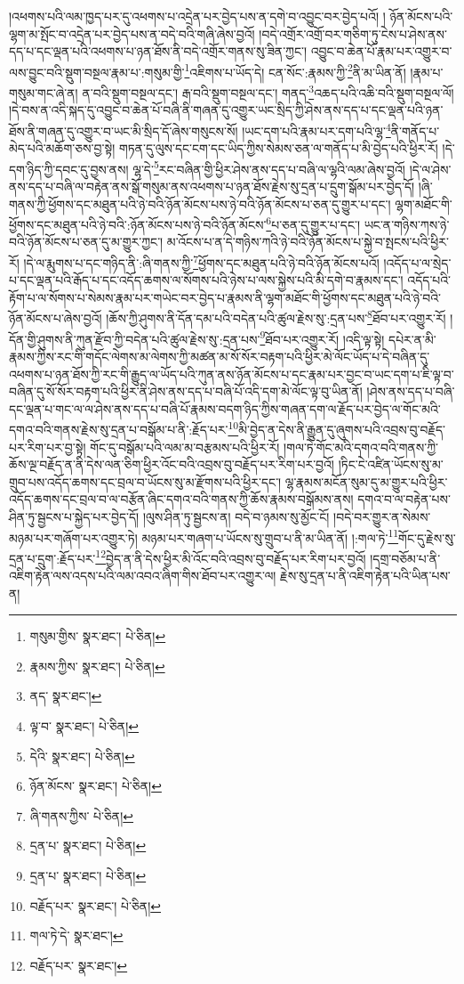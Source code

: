 །འཕགས་པའི་ལམ་ཁྱད་པར་དུ་འཕགས་པ་འདྲེན་པར་བྱེད་པས་ན་དགེ་བ་འབྱུང་བར་བྱེད་པའོ། །
ཉོན་མོངས་པའི་ལྷག་མ་སྤོང་བ་འདྲེན་པར་བྱེད་པས་ན་བདེ་བའི་གཞི་ཞེས་བྱའོ། །བདེ་འགྲོར་འགྲོ་བར་གཅིག་ཏུ་ངེས་པ་ཤེས་ནས་དད་པ་དང་ལྡན་པའི་འཕགས་པ་ཉན་ཐོས་ནི་བདེ་འགྲོར་གནས་སུ་ཟིན་ཀྱང་། འབྱུང་བ་ཆེན་པོ་རྣམ་པར་འགྱུར་བ་ལས་བྱུང་བའི་སྡུག་བསྔལ་རྣམ་པ་:གསུམ་གྱི་\footnote{གསུམ་གྱིས་  སྣར་ཐང་།  པེ་ཅིན། }འཇིགས་པ་ཡོད་དེ། ངན་སོང་:རྣམས་ཀྱི་\footnote{རྣམས་ཀྱིས་  སྣར་ཐང་།  པེ་ཅིན། }ནི་མ་ཡིན་ནོ། །རྣམ་པ་གསུམ་གང་ཞེ་ན། ན་བའི་སྡུག་བསྔལ་དང་། རྒ་བའི་སྡུག་བསྔལ་དང་། གནད་\footnote{ནད་  སྣར་ཐང་། }འཆད་པའི་འཆི་བའི་སྡུག་བསྔལ་ལོ། །དེ་བས་ན་འདི་སྐད་དུ་འབྱུང་བ་ཆེན་པོ་བཞི་ནི་གཞན་དུ་འགྱུར་ཡང་སྲིད་ཀྱི་ཤེས་ནས་དད་པ་དང་ལྡན་པའི་ཉན་ཐོས་ནི་གཞན་དུ་འགྱུར་བ་ཡང་མི་སྲིད་དོ་ཞེས་གསུངས་སོ། །ཡང་དག་པའི་རྣམ་པར་དག་པའི་ལྷ་\footnote{ལྟ་བ་  སྣར་ཐང་།  པེ་ཅིན། }ནི་གནོད་པ་མེད་པའི་མཆོག་ཅས་བྱ་སྟེ། གཏན་དུ་ལུས་དང་ངག་དང་ཡིད་ཀྱིས་སེམས་ཅན་ལ་གནོད་པ་མི་བྱེད་པའི་ཕྱིར་རོ། །དེ་དག་ཉིད་ཀྱི་དབང་དུ་བྱས་ནས། ལྷ་དེ་\footnote{དེའི་  སྣར་ཐང་།  པེ་ཅིན། }རང་བཞིན་གྱི་ཕྱིར་ཤེས་ནས་དད་པ་བཞི་ལ་ལྷའི་ལམ་ཞེས་བྱའོ། །དེ་ལ་ཤེས་ནས་དད་པ་བཞི་ལ་བརྟེན་ནས་སྒོ་གསུམ་ནས་འཕགས་པ་ཉན་ཐོས་རྗེས་སུ་དྲན་པ་དྲུག་སྒོམ་པར་བྱེད་དོ། །ཞི་གནས་ཀྱི་ཕྱོགས་དང་མཐུན་པའི་ཉེ་བའི་ཉོན་མོངས་པས་ཉེ་བའི་ཉོན་མོངས་པ་ཅན་དུ་གྱུར་པ་དང་། ལྷག་མཐོང་གི་ཕྱོགས་དང་མཐུན་པའི་ཉེ་བའི་:ཉོན་མོངས་པས་ཉེ་བའི་ཉོན་མོངས་\footnote{ཉོན་མོངས་  སྣར་ཐང་།  པེ་ཅིན། }པ་ཅན་དུ་གྱུར་པ་དང་། ཡང་ན་གཉིས་ཀས་ཉེ་བའི་ཉོན་མོངས་པ་ཅན་དུ་མ་གྱུར་ཀྱང་། མ་འོངས་པ་ན་དེ་གཉིས་ཀའི་ཉེ་བའི་ཉོན་མོངས་པ་སྐྱེ་བ་སྤངས་པའི་ཕྱིར་རོ། །དེ་ལ་རྨུགས་པ་དང་གཉིད་ནི་:ཞི་གནས་ཀྱི་\footnote{ཞི་གནས་ཀྱིས་  པེ་ཅིན། }ཕྱོགས་དང་མཐུན་པའི་ཉེ་བའི་ཉོན་མོངས་པའོ། །འདོད་པ་ལ་སྲེད་པ་དང་ལྡན་པའི་རྒོད་པ་དང་འདོད་ཆགས་ལ་སོགས་པའི་ཉེས་པ་ལས་སྐྱེས་པའི་མི་དགེ་བ་རྣམས་དང་། འདོད་པའི་རྟོག་པ་ལ་སོགས་པ་སེམས་རྣམ་པར་གཡེང་བར་བྱེད་པ་རྣམས་ནི་ལྷག་མཐོང་གི་ཕྱོགས་དང་མཐུན་པའི་ཉེ་བའི་ཉོན་མོངས་པ་ཞེས་བྱའོ། །ཆོས་ཀྱི་ཤུགས་ནི་དོན་དམ་པའི་བདེན་པའི་ཚུལ་རྗེས་སུ་:དྲན་པས་\footnote{དྲན་པ་  སྣར་ཐང་།  པེ་ཅིན། }ཐོབ་པར་འགྱུར་རོ། །དོན་གྱི་ཤུགས་ནི་ཀུན་རྫོབ་ཀྱི་བདེན་པའི་ཚུལ་རྗེས་སུ་:དྲན་པས་\footnote{དྲན་པ་  སྣར་ཐང་།  པེ་ཅིན། }ཐོབ་པར་འགྱུར་རོ། །འདི་ལྟ་སྟེ། དཔེར་ན་མི་རྣམས་ཀྱིས་རང་གི་གདོང་ལེགས་མ་ལེགས་ཀྱི་མཚན་མ་སོ་སོར་བརྟག་པའི་ཕྱིར་མེ་ལོང་ཡོད་པ་དེ་བཞིན་དུ་འཕགས་པ་ཉན་ཐོས་ཀྱི་རང་གི་རྒྱུད་ལ་ཡོད་པའི་ཀུན་ནས་ཉོན་མོངས་པ་དང་རྣམ་པར་བྱང་བ་ཡང་དག་པ་ཇི་ལྟ་བ་བཞིན་དུ་སོ་སོར་བརྟག་པའི་ཕྱིར་ནི་ཤེས་ནས་དད་པ་བཞི་པོ་འདི་དག་མེ་ལོང་ལྟ་བུ་ཡིན་ནོ། །ཤེས་ནས་དད་པ་བཞི་དང་ལྡན་པ་གང་ལ་ལ་ཤེས་ནས་དད་པ་བཞི་པོ་རྣམས་བདག་ཉིད་ཀྱིས་གཞན་དག་ལ་རྗོད་པར་བྱེད་ལ་གོང་མའི་དགའ་བའི་གནས་རྗེས་སུ་དྲན་པ་བསྒོམ་པ་ནི་:རྗོད་པར་\footnote{བརྗོད་པར་  སྣར་ཐང་།  པེ་ཅིན། }མི་བྱེད་ན་དེས་ནི་རྒྱུན་དུ་ཞུགས་པའི་འབྲས་བུ་བརྗོད་པར་རིག་པར་བྱ་སྟེ། གོང་དུ་བསྒོམ་པའི་ལམ་མ་བརྩམས་པའི་ཕྱིར་རོ། །གལ་ཏེ་གོང་མའི་དགའ་བའི་གནས་ཀྱི་ཆོས་ལྔ་བརྗོད་ན་ནི་དེས་ལན་ཅིག་ཕྱིར་འོང་བའི་འབྲས་བུ་བརྗོད་པར་རིག་པར་བྱའོ། །ཏིང་ངེ་འཛིན་ཡོངས་སུ་མ་གྲུབ་པས་འདོད་ཆགས་དང་བྲལ་བ་ཡོངས་སུ་མ་རྫོགས་པའི་ཕྱིར་དང་། ལྷ་རྣམས་མངོན་སུམ་དུ་མ་གྱུར་པའི་ཕྱིར་འདོད་ཆགས་དང་བྲལ་བ་ལ་བརྩོན་ཞིང་དགའ་བའི་གནས་ཀྱི་ཆོས་རྣམས་བསྒོམས་ནས། དགའ་བ་ལ་བརྟེན་པས་ཤིན་ཏུ་སྦྱངས་པ་སྐྱེད་པར་བྱེད་དོ། །ལུས་ཤིན་ཏུ་སྦྱངས་ན། བདེ་བ་ཉམས་སུ་མྱོང་ངོ། །བདེ་བར་གྱུར་ན་སེམས་མཉམ་པར་གཞོག་པར་འགྱུར་ཏེ། མཉམ་པར་གཞག་པ་ཡོངས་སུ་གྲུབ་པ་ནི་མ་ཡིན་ནོ། །:གལ་ཏེ་\footnote{གལ་ཏེ་དེ་  སྣར་ཐང་། }གོང་དུ་རྗེས་སུ་དྲན་པ་དྲུག་:རྗོད་པར་\footnote{བརྗོད་པར་  སྣར་ཐང་། }བྱེད་ན་ནི་དེས་ཕྱིར་མི་འོང་བའི་འབྲས་བུ་བརྗོད་པར་རིག་པར་བྱའོ། །དགྲ་བཅོམ་པ་ནི་འཇིག་རྟེན་ལས་འདས་པའི་ལམ་འབའ་ཞིག་གིས་ཐོབ་པར་འགྱུར་ལ། རྗེས་སུ་དྲན་པ་ནི་འཇིག་རྟེན་པའི་ཡིན་པས་ན། 
